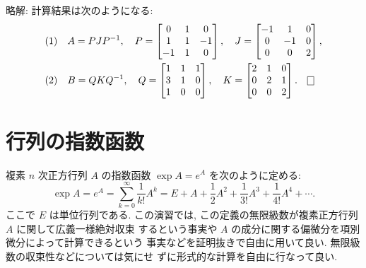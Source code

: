 \documentclass[12pt,twoside]{jarticle}
\newcommand\commentout[1]{#1}
\newcommand\commentout[1]{}
\begin{document}
\commentout{
\medskip\noindent
略解: 計算結果は次のようになる:
\begin{align*}
  &
  \text{(1)} \quad
  A = PJP^{-1},
  \quad
  P =
  \begin{bmatrix}
     0 &  1 &  0 \\
     1 &  1 & -1 \\
    -1 &  1 &  0 \\
  \end{bmatrix},
  \quad
  J = 
  \begin{bmatrix}
    -1 &  1 &  0 \\
     0 & -1 &  0 \\
     0 &  0 &  2 \\
  \end{bmatrix},
  \\ &
  \text{(2)} \quad
  B = QKQ^{-1},
  \quad
  Q =
  \begin{bmatrix}
    1 & 1 & 1 \\
    3 & 1 & 0 \\
    1 & 0 & 0 \\
  \end{bmatrix},
  \quad
  K = 
  \begin{bmatrix}
    2 & 1 & 0 \\
    0 & 2 & 1 \\
    0 & 0 & 2 \\
  \end{bmatrix}.
  \qed
\end{align*}
}


\section{行列の指数函数}
\label{sec:exp}

複素 $n$ 次正方行列 $A$ の指数函数 $\exp A = e^A$ を次のように定める:
\begin{equation*}
  \exp A = e^A 
  = \sum_{k=0}^\infty \frac{1}{k!} A^k
  = E + A + \frac{1}{2}A^2 + \frac{1}{3!}A^3 + \frac{1}{4!}A^4 + \cdots.
\end{equation*}
ここで $E$ は単位行列である.
この演習では, この定義の無限級数が複素正方行列 $A$ に関して広義一様絶対収束
するという事実や $A$ の成分に関する偏微分を項別微分によって計算できるという
事実などを証明抜きで自由に用いて良い.  無限級数の収束性などについては気にせ
ずに形式的な計算を自由に行なって良い.

\bigskip
\end{document}
